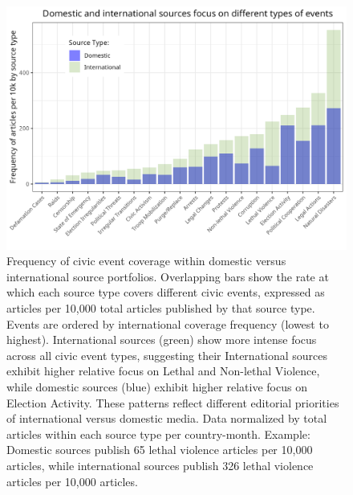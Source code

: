 \documentclass[
  letterpaper,
  DIV=11,
  numbers=noendperiod]{scrartcl}
\begin{document}
\begin{figure}

{\centering \includegraphics{source_comparison/figures/event_share_total.png}

}

\caption{\label{fig-event_share_total}Frequency of civic event coverage
within domestic versus international source portfolios. Overlapping bars
show the rate at which each source type covers different civic events,
expressed as articles per 10,000 total articles published by that source
type. Events are ordered by international coverage frequency (lowest to
highest). International sources (green) show more intense focus across
all civic event types, suggesting their International sources exhibit
higher relative focus on Lethal and Non-lethal Violence, while domestic
sources (blue) exhibit higher relative focus on Election Activity. These
patterns reflect different editorial priorities of international versus
domestic media. Data normalized by total articles within each source
type per country-month. Example: Domestic sources publish 65 lethal
violence articles per 10,000 articles, while international sources
publish 326 lethal violence articles per 10,000 articles.}

\end{figure}
\end{document}
